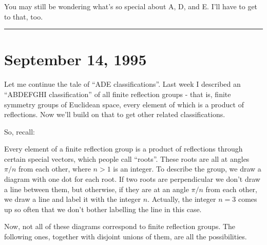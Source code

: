 \documentclass{article}
\begin{document}
You may still be wondering what's so special about A, D, and E. I'll
have to get to that, too.

\begin{center}\rule{0.5\linewidth}{0.5pt}\end{center}



\hypertarget{week63}{%
\section{September 14, 1995}\label{week63}}

Let me continue the tale of ``ADE classifications''. Last week I
described an ``ABDEFGHI classification'' of all finite reflection groups
- that is, finite symmetry groups of Euclidean space, every element of
which is a product of reflections. Now we'll build on that to get other
related classifications.

So, recall:

Every element of a finite reflection group is a product of reflections
through certain special vectors, which people call ``roots''. These
roots are all at angles \(\pi/n\) from each other, where \(n > 1\) is an
integer. To describe the group, we draw a diagram with one dot for each
root. If two roots are perpendicular we don't draw a line between them,
but otherwise, if they are at an angle \(\pi/n\) from each other, we
draw a line and label it with the integer \(n\). Actually, the integer
\(n = 3\) comes up so often that we don't bother labelling the line in
this case.

Now, not all of these diagrams correspond to finite reflection groups.
The following ones, together with disjoint unions of them, are all the
possibilities.
\end{document}
